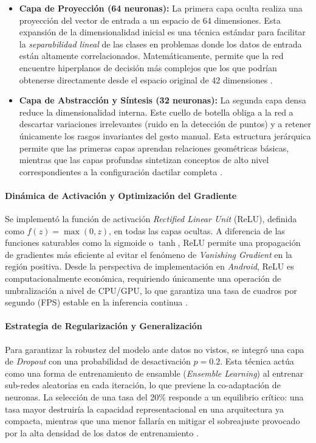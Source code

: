 	\begin{itemize}
		\item \textbf{Capa de Proyección (64 neuronas):} La primera capa oculta realiza una proyección del vector de entrada a un espacio de 64 dimensiones. Esta expansión de la dimensionalidad inicial es una técnica estándar para facilitar la \textit{separabilidad lineal} de las clases en problemas donde los datos de entrada están altamente correlacionados. Matemáticamente, permite que la red encuentre hiperplanos de decisión más complejos que los que podrían obtenerse directamente desde el espacio original de 42 dimensiones \cite{Geron2022HandsOnML}.
		
		\item \textbf{Capa de Abstracción y Síntesis (32 neuronas):} La segunda capa densa reduce la dimensionalidad interna. Este cuello de botella obliga a la red a descartar variaciones irrelevantes (ruido en la detección de puntos) y a retener únicamente los rasgos invariantes del gesto manual. Esta estructura jerárquica permite que las primeras capas aprendan relaciones geométricas básicas, mientras que las capas profundas sintetizan conceptos de alto nivel correspondientes a la configuración dactilar completa \cite{Chollet2021}.
	\end{itemize}
	
	\paragraph{Dinámica de Activación y Optimización del Gradiente}
	Se implementó la función de activación \textit{Rectified Linear Unit} (ReLU), definida como $f(z) = \max(0, z)$, en todas las capas ocultas. A diferencia de las funciones saturables como la sigmoide o $\tanh$, ReLU permite una propagación de gradientes más eficiente al evitar el fenómeno de \textit{Vanishing Gradient} en la región positiva. Desde la perspectiva de implementación en \textit{Android}, ReLU es computacionalmente económica, requiriendo únicamente una operación de umbralización a nivel de CPU/GPU, lo que garantiza una tasa de cuadros por segundo (FPS) estable en la inferencia continua \cite{Nair2010ReLU}.
	
	\paragraph{Estrategia de Regularización y Generalización}
	Para garantizar la robustez del modelo ante datos no vistos, se integró una capa de \textit{Dropout} con una probabilidad de desactivación $p=0.2$. Esta técnica actúa como una forma de entrenamiento de ensamble (\textit{Ensemble Learning}) al entrenar sub-redes aleatorias en cada iteración, lo que previene la co-adaptación de neuronas. La selección de una tasa del 20\% responde a un equilibrio crítico: una tasa mayor destruiría la capacidad representacional en una arquitectura ya compacta, mientras que una menor fallaría en mitigar el sobreajuste provocado por la alta densidad de los datos de entrenamiento \cite{Srivastava2014Dropout}.
	
